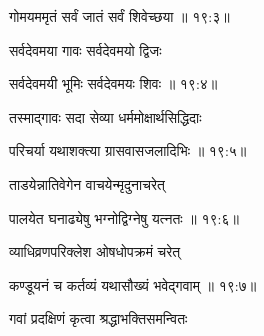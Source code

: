 
{\devanagarifont गोमयममृतं सर्वं जातं सर्वं शिवेच्छया {॥ १९:३॥} \veg\dontdisplaylinenum }%

{\devanagarifont सर्वदेवमया गावः सर्वदेवमयो द्विजः \thinspace{\dandab} \dontdisplaylinenum }%


{\devanagarifont सर्वदेवमयी भूमिः सर्वदेवमयः शिवः {॥ १९:४॥} \veg\dontdisplaylinenum }%

{\devanagarifont तस्माद्गावः सदा सेव्या धर्ममोक्षार्थसिद्धिदाः \thinspace{\dandab} \dontdisplaylinenum }%


{\devanagarifont परिचर्या यथाशक्त्या ग्रासवासजलादिभिः {॥ १९:५॥} \veg\dontdisplaylinenum }%
 
{\devanagarifont ताडयेन्नातिवेगेन वाचयेन्मृदुनाचरेत् \thinspace{\dandab} \dontdisplaylinenum }%
 

{\devanagarifont पालयेत घनाढ्येषु भग्नोद्विग्नेषु यत्नतः {॥ १९:६॥} \veg\dontdisplaylinenum }%

{\devanagarifont व्याधिव्रणपरिक्लेश ओषधोपक्रमं चरेत् \thinspace{\dandab} \dontdisplaylinenum }%


{\devanagarifont कण्डूयनं च कर्तव्यं यथासौख्यं भवेद्गवाम् {॥ १९:७॥} \veg\dontdisplaylinenum }%
 
{\devanagarifont गवां प्रदक्षिणं कृत्वा श्रद्धाभक्तिसमन्वितः \thinspace{\dandab} \dontdisplaylinenum }%

